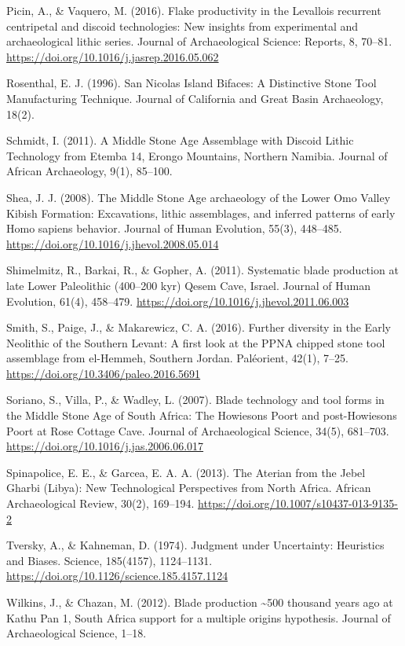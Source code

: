 \documentclass[
]{article}
\begin{document}
Picin, A., \& Vaquero, M. (2016). Flake productivity in the Levallois
recurrent centripetal and discoid technologies: New insights from
experimental and archaeological lithic series. Journal of Archaeological
Science: Reports, 8, 70--81.
\url{https://doi.org/10.1016/j.jasrep.2016.05.062}

Rosenthal, E. J. (1996). San Nicolas Island Bifaces: A Distinctive Stone
Tool Manufacturing Technique. Journal of California and Great Basin
Archaeology, 18(2).

Schmidt, I. (2011). A Middle Stone Age Assemblage with Discoid Lithic
Technology from Etemba 14, Erongo Mountains, Northern Namibia. Journal
of African Archaeology, 9(1), 85--100.

Shea, J. J. (2008). The Middle Stone Age archaeology of the Lower Omo
Valley Kibish Formation: Excavations, lithic assemblages, and inferred
patterns of early Homo sapiens behavior. Journal of Human Evolution,
55(3), 448--485. \url{https://doi.org/10.1016/j.jhevol.2008.05.014}

Shimelmitz, R., Barkai, R., \& Gopher, A. (2011). Systematic blade
production at late Lower Paleolithic (400--200 kyr) Qesem Cave, Israel.
Journal of Human Evolution, 61(4), 458--479.
\url{https://doi.org/10.1016/j.jhevol.2011.06.003}

Smith, S., Paige, J., \& Makarewicz, C. A. (2016). Further diversity in
the Early Neolithic of the Southern Levant: A first look at the PPNA
chipped stone tool assemblage from el-Hemmeh, Southern Jordan.
Paléorient, 42(1), 7--25. \url{https://doi.org/10.3406/paleo.2016.5691}

Soriano, S., Villa, P., \& Wadley, L. (2007). Blade technology and tool
forms in the Middle Stone Age of South Africa: The Howiesons Poort and
post-Howiesons Poort at Rose Cottage Cave. Journal of Archaeological
Science, 34(5), 681--703.
\url{https://doi.org/10.1016/j.jas.2006.06.017}

Spinapolice, E. E., \& Garcea, E. A. A. (2013). The Aterian from the
Jebel Gharbi (Libya): New Technological Perspectives from North Africa.
African Archaeological Review, 30(2), 169--194.
\url{https://doi.org/10.1007/s10437-013-9135-2}

Tversky, A., \& Kahneman, D. (1974). Judgment under Uncertainty:
Heuristics and Biases. Science, 185(4157), 1124--1131.
\url{https://doi.org/10.1126/science.185.4157.1124}

Wilkins, J., \& Chazan, M. (2012). Blade production \textasciitilde500
thousand years ago at Kathu Pan 1, South Africa support for a multiple
origins hypothesis. Journal of Archaeological Science, 1--18.
\end{document}
